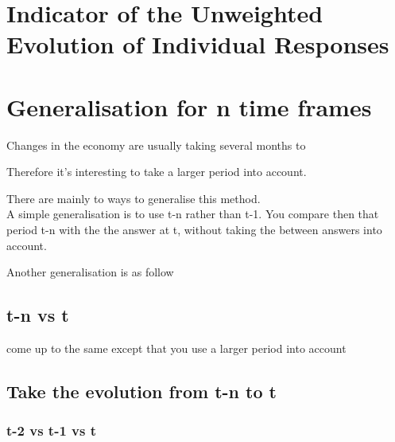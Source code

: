 \documentclass[12pt,a4paper,oneside]{book}
\begin{document}
\section{Indicator of the Unweighted Evolution of Individual Responses}

\section{Generalisation for n time frames}

Changes in the economy are usually taking several months to 

Therefore it's interesting to take a larger period into account.

There are mainly to ways to generalise this method. \\ A simple generalisation is to use t-n rather than t-1. You compare then that period t-n with the the answer at t, without taking the between answers into account.

Another generalisation is as follow

\subsection{t-n vs t}

come up to the same except that you use a larger period into account


\subsection{Take the evolution from t-n to t}


\subsubsection{t-2 vs t-1 vs t}
\end{document}
